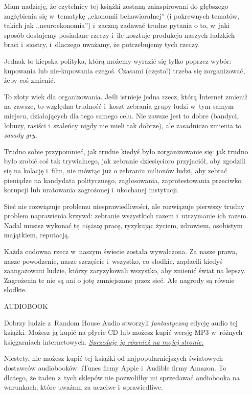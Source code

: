 \documentclass[oneside,polish,11pt,rmheadings]{mwbk}
\begin{document}
Mam nadzieję, że czytelnicy tej książki zostaną zainspirowani do głębszego zagłębienia się w~tematykę ,,ekonomii behawioralnej'' (i pokrewnych tematów, takich jak ,,neuroekonomia'') i~zaczną zadawać trudne pytania o to, w~jaki sposób dostajemy posiadane rzeczy i~ile kosztuje produkcja naszych ludzkich braci i~siostry, i~dlaczego uważamy, że potrzebujemy tych rzeczy. 


Jednak to kiepska polityka, którą możemy wyrazić się tylko poprzez wybór: kupowania lub nie-kupowania czegoś. Czasami (często!) trzeba się zorganizować, żeby coś zmienić. 


To złoty wiek dla organizowania. Jeśli istnieje jedna rzecz, którą Internet zmienił na zawsze, to względna trudność i~koszt zebrania grupy ludzi w~tym samym miejscu, działających dla tego samego celu. Nie zawsze jest to dobre (bandyci, łobuzy, rasiści i~szaleńcy nigdy nie mieli tak dobrze), ale zasadniczo zmienia to \textit{zasady gry}. 


Trudno sobie przypomnieć, jak trudne kiedyś było zorganizowanie się: jak trudno było zrobić coś tak trywialnego, jak zebranie dziesięcioro przyjaciół, aby zgodzili się na kolację i~film, nie mówiąc już o zebraniu milionów ludzi, aby zebrać pieniądze na kandydata politycznego, zagłosowania, zaprotestowania przeciwko korupcji lub uratowania zagrożonej i~ukochanej instytucji. 


Sieć nie rozwiązuje problemu niesprawiedliwości, ale rozwiązuje pierwszy trudny problem naprawienia krzywd: zebranie wszystkich razem i~utrzymanie ich razem. Nadal musisz wykonać tę \textit{cięższą }pracę, ryzykując życiem, zdrowiem, osobistym majątkiem, reputacją. 


Każda cudowna rzecz w~naszym świecie została wywalczona. Za nasze prawa, nasze powodzenie, nasze szczęście i~wszystko, co słodkie, zapłacili kiedyś zaangażowani ludzie, którzy zaryzykowali wszystko, aby zmienić świat na lepszy. Zagrożenia te nie są ani o jotę zmniejszane przez sieć. Ale nagrody są równie słodkie. 

\bigskip
\noindent AUDIOBOOK  


Dobrzy ludzie z~Random House Audio stworzyli \textit{fantastyczną }edycję audio tej książki. Możesz ją kupić na płycie CD lub możesz kupić wersję MP3 w~różnych księgarniach internetowych. \href{https://craphound.com/category/ftw/}{\textit{Sprzedaję ją również na mojej stronie.}}  


Niestety, nie możesz kupić tej książki od najpopularniejszych światowych dostawców audiobooków: iTunes firmy Apple i~Audible firmy Amazon. To dlatego, że żaden z~tych sklepów nie pozwoliłby mi sprzedawać audiobooka na warunkach, które uważam za uczciwe i~sprawiedliwe. 
\end{document}
